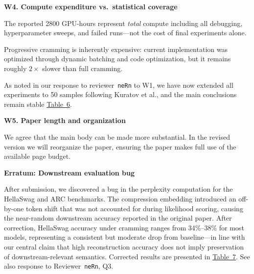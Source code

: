 \textbf{W4. Compute expenditure vs.\ statistical coverage}

The reported 2800 GPU-hours represent \emph{total} compute including all debugging,
hyperparameter sweeps, and failed runs---not the cost of final experiments alone.

Progressive cramming is inherently expensive: current implementation was optimized through dynamic batching and code optimization, but it remains roughly $2\times$ slower than full cramming.

As noted in our response to reviewer~\texttt{neRn} to W1, we have now extended all experiments to 50 samples following Kuratov et al., and the main conclusions remain stable \href{https://drive.google.com/file/d/148Cxg2jOx_-MIH5XC0I-oPbwVLG0Ktiz/view?usp=sharing}{Table~6}.




\textbf{W5. Paper length and organization}

We agree that the main body can be made more substantial. In the revised version we will
reorganize the paper, ensuring the paper makes full use of the available page budget.

\textbf{Erratum: Downstream evaluation bug}

After submission, we discovered a bug in the perplexity computation for the HellaSwag and ARC benchmarks. The compression embedding introduced an off-by-one token shift that was not accounted for during likelihood scoring, causing the near-random downstream accuracy reported in the original paper. After correction, HellaSwag accuracy under cramming ranges from 34\%--38\% for most models, representing a consistent but moderate drop from baseline---in line with our central claim that high reconstruction accuracy does not imply preservation of downstream-relevant semantics. Corrected results are presented in \href{https://drive.google.com/file/d/1DIjiTpyIqQ4xuW0k9Q7mjCOFuXUPz2YX/view?usp=sharing}{Table~7}. See also response to Reviewer~\texttt{neRn}, Q3.



